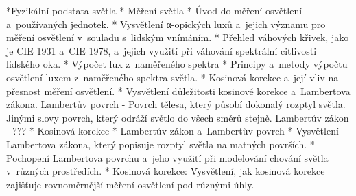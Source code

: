\medskip
\begitems
    *Fyzikální podstata světla
    * Měření světla
    *     Úvod do měření osvětlení a~používaných jednotek.
    *     Vysvětlení α-opických luxů a~jejich významu pro měření osvětlení v~souladu s~lidským vnímáním.
    *     Přehled váhových křivek, jako je CIE 1931 a~CIE 1978, a~jejich využití při váhování spektrální citlivosti lidského oka.
    * Výpočet lux z~naměřeného spektra
    *     Principy a~metody výpočtu osvětlení luxem z~naměřeného spektra světla.
    *     Kosinová korekce a~její vliv na přesnost měření osvětlení.
       * Vysvětlení důležitosti kosinové korekce a~Lambertova zákona.
Lambertův povrch - Povrch tělesa, který působí dokonalý rozptyl světla. Jinými slovy povrch, který odráží světlo do všech směrů stejně.
Lambertův zákon - ???
    * Kosinová korekce
    * Lambertův zákon a~Lambertův povrch
    *     Vysvětlení Lambertova zákona, který popisuje rozptyl světla na matných površích.
    *     Pochopení Lambertova povrchu a~jeho využití při modelování chování světla v~různých prostředích.
    *     Kosinová korekce: Vysvětlení, jak kosinová korekce zajišťuje rovnoměrnější měření osvětlení pod různými úhly.
\enditems

